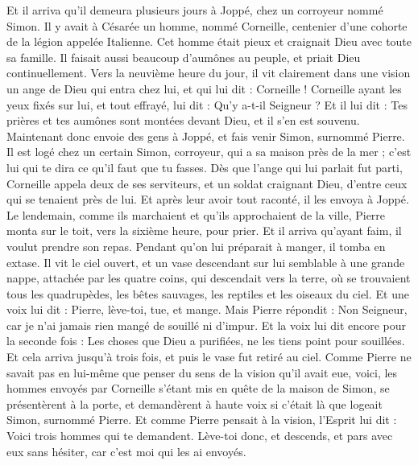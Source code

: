 \begin{multicols}{2}
Et il arriva qu'il demeura plusieurs jours à Joppé, chez un corroyeur nommé Simon.
\VerseOne{}Il y avait à Césarée un homme, nommé Corneille, centenier d'une cohorte de la légion appelée Italienne.
Cet homme était pieux et craignait Dieu avec toute sa famille. Il faisait aussi beaucoup d'aumônes au peuple, et priait Dieu continuellement.
Vers la neuvième heure du jour, il vit clairement dans une vision un ange de Dieu qui entra chez lui, et qui lui dit : Corneille !
Corneille ayant les yeux fixés sur lui, et tout effrayé, lui dit : Qu'y a-t-il Seigneur ? Et il lui dit : Tes prières et tes aumônes sont montées devant Dieu, et il s'en est souvenu.
Maintenant donc envoie des gens à Joppé, et fais venir Simon, surnommé Pierre.
Il est logé chez un certain Simon, corroyeur, qui a sa maison près de la mer ; c'est lui qui te dira ce qu'il faut que tu fasses.
Dès que l'ange qui lui parlait fut parti, Corneille appela deux de ses serviteurs, et un soldat craignant Dieu, d'entre ceux qui se tenaient près de lui.
Et après leur avoir tout raconté, il les envoya à Joppé.
Le lendemain, comme ils marchaient et qu'ils approchaient de la ville, Pierre monta sur le toit, vers la sixième heure, pour prier.
Et il arriva qu'ayant faim, il voulut prendre son repas. Pendant qu'on lui préparait à manger, il tomba en extase.
Il vit le ciel ouvert, et un vase descendant sur lui semblable à une grande nappe, attachée par les quatre coins, qui descendait vers la terre,
où se trouvaient tous les quadrupèdes, les bêtes sauvages, les reptiles et les oiseaux du ciel.
Et une voix lui dit : Pierre, lève-toi, tue, et mange.
Mais Pierre répondit : Non Seigneur, car je n'ai jamais rien mangé de souillé ni d'impur.
Et la voix lui dit encore pour la seconde fois : Les choses que Dieu a purifiées, ne les tiens point pour souillées.
Et cela arriva jusqu'à trois fois, et puis le vase fut retiré au ciel.
Comme Pierre ne savait pas en lui-même que penser du sens de la vision qu'il avait eue, voici, les hommes envoyés par Corneille s'étant mis en quête de la maison de Simon, se présentèrent à la porte,
et demandèrent à haute voix si c'était là que logeait Simon, surnommé Pierre.
Et comme Pierre pensait à la vision, l'Esprit lui dit : Voici trois hommes qui te demandent.
Lève-toi donc, et descends, et pars avec eux sans hésiter, car c'est moi qui les ai envoyés.

\end{multicols}
